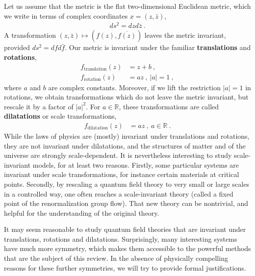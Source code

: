 \documentclass[12pt, a4paper, notitlepage, twoside]{report}
\numberwithin{equation}{section}
\theoremstyle{break}
\begin{document}
Let us assume that the metric is the flat two-dimensional Euclidean metric, which we write in terms of complex coordinates $x=(z,\bar{z})$,
\begin{align}
 ds^2 = dz d\bar{z} \ .
\end{align}
A transformation $(z,\bar{z}) \mapsto (f(z),\overline{f(z)})$ leaves the metric invariant, provided $ds^2 = dfd\bar{f}$.  
Our metric is invariant under the familiar \textbf{\boldmath translations} and \textbf{\boldmath rotations},
\begin{align}
f_\text{translation}(z) &= z+b \ ,
\\ 
f_\text{rotation}(z) &=a z \ , \ |a|=1\ ,
\end{align}
where $a$ and $b$ are complex constants.
Moreover, if we lift the restriction $|a|=1$ in rotations, we obtain transformations which do not leave the metric invariant, but rescale it by a factor of $|a|^2$.
For $a\in{\mathbb{R}}$, these transformations are called \textbf{\boldmath dilatations} or scale transformations,
\begin{align}
 f_\text{dilatation}(z) &= a z\ , \ a\in {\mathbb{R}}\ .
\end{align}
While the laws of physics are (mostly) invariant under translations and rotations, they are not invariant under dilatations, and the structures of matter and of the universe are strongly scale-dependent.
It is nevertheless interesting to study scale-invariant models, for at least two reasons.
Firstly, some particular systems are invariant under scale transformations, for instance certain materials at critical points.
Secondly, by rescaling a quantum field theory to very small or large scales in a controlled way, one often reaches a scale-invariant theory (called a fixed point of the renormalization group flow).
That new theory can be nontrivial, and helpful for the understanding of the original theory.

It may seem reasonable to study quantum field theories that are invariant under translations, rotations and dilatations. 
Surprisingly, many interesting systems have much more symmetry, which makes them accessible to the powerful methods that are the subject of this review.
In the absence of physically compelling reasons for these further symmetries, we will try to provide formal justifications.
\end{document}
